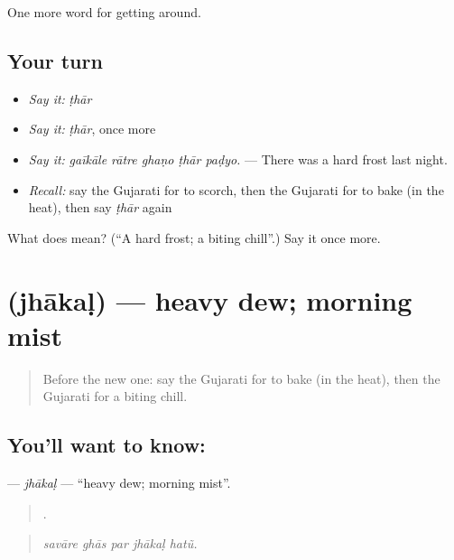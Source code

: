 \begin{grammarlens}[title={What you've built}]
One more word for getting around.
\end{grammarlens}

\subsection*{Your turn}
\begin{itemize}
\raggedright
  \item \emph{Say it:} \emph{ṭhār}
  \item \emph{Say it:} \emph{ṭhār}, once more
  \item \emph{Say it:} \emph{gaīkāle rātre ghaṇo ṭhār paḍyo.} — There was a hard frost last night.
  \item \emph{Recall:} say the Gujarati for to scorch, then the Gujarati for to bake (in the heat), then say \emph{ṭhār} again
\end{itemize}

\begin{tcolorbox}[breakable,colback=teal!4,colframe=teal!35!black,title={Before you move on}]
What does  mean? (\textquotedblleft{}A hard frost; a biting chill\textquotedblright{}.) Say it once more.
\end{tcolorbox}
\section[\texorpdfstring{\gu{ઝાકળ} (jhākaḷ)}{ઝાકળ (jhākaḷ)}]{ (jhākaḷ) — heavy dew; morning mist}

\label{lesson:GU-C437-jhakal}



\begin{quote}
Before the new one: say the Gujarati for to bake (in the heat), then the Gujarati for a biting chill.
\end{quote}

\subsection*{You'll want to know: }
\textbf{} — \emph{jhākaḷ} — \textquotedblleft{}heavy dew; morning mist\textquotedblright{}.

\begin{quote}
    .
\end{quote}

\begin{quote}
\emph{savāre ghās par jhākaḷ hatũ.}
\end{quote}

